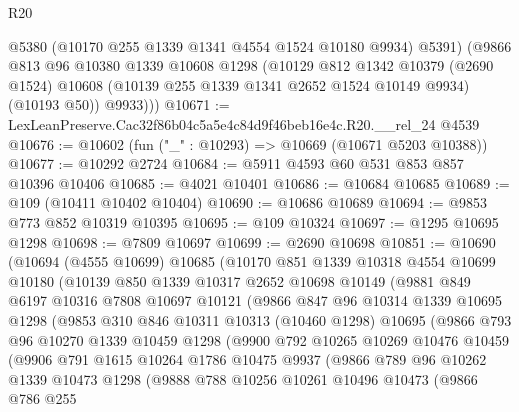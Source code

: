 \begin{lexlean}{R20}
\begin{coremodule}
          @5380
          (@10170 @255 @1339 @1341 @4554 @1524 @10180 @9934)
          @5391)
        (@9866
          @813
          @96
          @10380
          @1339
          @10608
          @1298
          (@10129
            @812
            @1342
            @10379
            (@2690 @1524)
            @10608
            (@10139 @255 @1339 @1341 @2652 @1524 @10149 @9934)
            (@10193 @50))
          @9933)))
@10671 := LexLeanPreserve.Cac32f86b04c5a5e4c84d9f46beb16e4c.R20.__rel_24 @4539
@10676 := @10602 (fun ("_" : @10293) => @10669 (@10671 @5203 @10388))
@10677 := @10292 @2724
@10684 := @5911 @4593 @60 @531 @853 @857 @10396 @10406
@10685 := @4021 @10401
@10686 := @10684 @10685
@10689 := @109 (@10411 @10402 @10404)
@10690 := @10686 @10689
@10694 := @9853 @773 @852 @10319 @10395
@10695 := @109 @10324
@10697 := @1295 @10695 @1298
@10698 := @7809 @10697
@10699 := @2690 @10698
@10851 := @10690
    (@10694
      (@4555 @10699)
      @10685
      (@10170
        @851
        @1339
        @10318
        @4554
        @10699
        @10180
        (@10139
          @850
          @1339
          @10317
          @2652
          @10698
          @10149
          (@9881
            @849
            @6197
            @10316
            @7808
            @10697
            @10121
            (@9866
              @847
              @96
              @10314
              @1339
              @10695
              @1298
              (@9853
                @310
                @846
                @10311
                @10313
                (@10460 @1298)
                @10695
                (@9866
                  @793
                  @96
                  @10270
                  @1339
                  @10459
                  @1298
                  (@9900
                    @792
                    @10265
                    @10269
                    @10476
                    @10459
                    (@9906
                      @791
                      @1615
                      @10264
                      @1786
                      @10475
                      @9937
                      (@9866
                        @789
                        @96
                        @10262
                        @1339
                        @10473
                        @1298
                        (@9888
                          @788
                          @10256
                          @10261
                          @10496
                          @10473
                          (@9866
                            @786
                            @255

\end{coremodule}
\end{lexlean}
